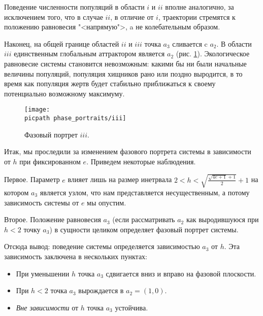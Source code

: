 \documentclass[oneside,final,12pt]{article}
\newcommand*\picsize{0.5\textwidth}
\newcommand*\picpath{pictures/}
\theoremstyle{plain}
\theoremstyle{remark}
\theoremstyle{definition}
\theoremstyle{plain}
\begin{document}
Поведение численности популяций в области \(i\) и \(ii\) вполне аналогично, за исключением того, что в случае \(ii\), в отличие от \(i\), траектории стремятся к положению равновесия "<напрямую">, a не колебательным образом.

		Наконец, на общей границе областей \(ii\) и \(iii\) точка \(a_3\) сливается c \(a_2\). В области \(iii\) единственным глобальным аттрактором является \(a_2\) (рис. \ref{phase_portrait_iii}). Экологическое равновесие системы становится невозможным: какими бы ни были начальные величины популяций, популяция хищников рано или поздно выродится, в то время как популяция жертв будет стабильно приближаться к своему потенциально возможному максимуму. 

		\begin{figure}[!h]
			\centering
			\texttt{[image: \\picpath phase\_portraits/iii]}
			\caption{Фазовый портрет \(iii\).} \label{phase_portrait_iii}
		\end{figure}
	
		Итак, мы проследили за изменением фазового портрета системы в зависимости от \(h\) при фиксированном \(e\). Приведем некоторые наблюдения. 

		Первое. Параметр \(e\) влияет лишь на размер инетрвала \(2 < h < \sqrt{\frac{\sqrt{4e+1}+1}{2}} + 1\) на котором \(a_3\) является узлом, что нам представляется несущественным, а потому зависимость системы от \(e\) мы опустим. 

		Второе. Положение равновесия \(a_3\) (если рассматривать \(a_2\) как выродившуюся при \(h<2\) точку \(a_3\)) в сущности целиком определяет фазовый портрет системы.
		
		\bigskip
		Отсюда вывод: поведение системы определяется зависимостью \(a_3\) от \(h\). Эта зависимость заключена в нескольких пунктах:
		\begin{itemize}
			\item При уменьшении \(h\) точка \(a_3\) сдвигается вниз и вправо на фазовой плоскости.
			\item При \(h < 2\) точка \(a_3\) вырождается в \(a_2 = (1,0)\).
			\item \emph{Вне зависимости} от \(h\) точка \(a_3\) устойчива.
		\end{itemize}
\end{document}
